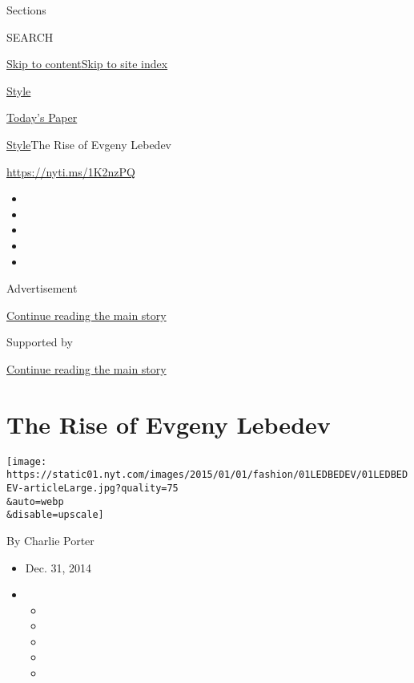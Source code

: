 Sections

SEARCH

\protect\hyperlink{site-content}{Skip to
content}\protect\hyperlink{site-index}{Skip to site index}

\href{https://www.nytimes.com/section/style}{Style}

\href{https://myaccount.nytimes.com/auth/login?response_type=cookie\&client_id=vi}{}

\href{https://www.nytimes.com/section/todayspaper}{Today's Paper}

\href{/section/style}{Style}\textbar{}The Rise of Evgeny Lebedev

\url{https://nyti.ms/1K2nzPQ}

\begin{itemize}
\item
\item
\item
\item
\item
\end{itemize}

Advertisement

\protect\hyperlink{after-top}{Continue reading the main story}

Supported by

\protect\hyperlink{after-sponsor}{Continue reading the main story}

\hypertarget{the-rise-of-evgeny-lebedev}{%
\section{The Rise of Evgeny Lebedev}\label{the-rise-of-evgeny-lebedev}}

\texttt{[image: https://static01.nyt.com/images/2015/01/01/fashion/01LEDBEDEV/01LEDBEDEV-articleLarge.jpg?quality=75\\\&auto=webp\\\&disable=upscale]}

By Charlie Porter

\begin{itemize}
\item
  Dec. 31, 2014
\item
  \begin{itemize}
  \item
  \item
  \item
  \item
  \item
  \end{itemize}
\end{itemize}

